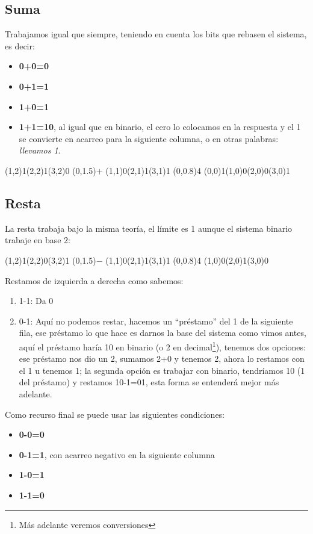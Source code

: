 \documentclass[
	12pt, %
	fleqn, %
	a4paper, %
]{LegrandOrangeBook}
\begin{document}
\subsection{Suma}
Trabajamos igual que siempre, teniendo en cuenta los bits que rebasen el sistema, es decir:
\begin{itemize}
\item \textbf{0+0=0}
\item \textbf{0+1=1}
\item \textbf{1+0=1}
\item \textbf{1+1=10}, al igual que en binario, el cero lo colocamos en la respuesta y el 1 se convierte en acarreo para la siguiente columna, o en otras palabras: \textit{llevamos 1}.
\end{itemize}
\begin{center}
\par\vspace{2\oplineheight}
\oplput(1,2){1}\oplput(2,2){1}\oplput(3,2){0}
\oplput(0,1.5){$+$}
\oplput(1,1){0}\oplput(2,1){1}\oplput(3,1){1}
\ophline(0,0.8){4}
\oplput(0,0){1}\oplput(1,0){0}\oplput(2,0){0}\oplput(3,0){1}
\end{center}
\subsection{Resta}
La resta trabaja bajo la misma teoría, el límite es 1 aunque el sistema binario trabaje en base 2:
\begin{center}
\par\vspace{2\oplineheight}
\oplput(1,2){1}\oplput(2,2){0}\oplput(3,2){1}
\oplput(0,1.5){$-$}
\oplput(1,1){0}\oplput(2,1){1}\oplput(3,1){1}
\ophline(0,0.8){4}
\oplput(1,0){0}\oplput(2,0){1}\oplput(3,0){0}
\end{center}
Restamos de izquierda a derecha como sabemos:
\begin{enumerate}
\item 1-1: Da 0
\item 0-1: Aquí no podemos restar, hacemos un ``préstamo'' del 1 de la siguiente fila, ese préstamo lo que hace es darnos la base del sistema como vimos antes, aquí el préstamo haría 10 en binario (o 2 en decimal\footnote{Más adelante veremos conversiones}), tenemos dos opciones: ese préstamo nos dio un 2, sumamos 2+0 y tenemos 2, ahora lo restamos con el 1 u tenemos 1; la segunda opción es trabajar con binario, tendríamos 10 (1 del préstamo) y restamos 10-1=01, esta forma se entenderá  mejor más adelante.
\end{enumerate}
Como recurso final se puede usar las siguientes condiciones:
\begin{itemize}
\item \textbf{0-0=0}
\item \textbf{0-1=1}, con acarreo negativo en la siguiente columna
\item \textbf{1-0=1}
\item \textbf{1-1=0}
\end{itemize}
\end{document}
